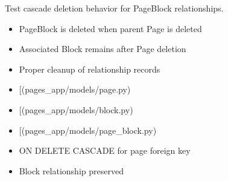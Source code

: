 \documentclass[letterpaper,10pt,english]{sphinxmanual}
\begin{document}
\begin{fulllineitems}
\begin{fulllineitems}
\end{fulllineitems}


\begin{fulllineitems}
\label{\detokenize{pages_app.tests:pages_app.tests.test_models.PageBlockModelTest.test_pageblock_cascade_deletion}}
\pysigstartsignatures
\pysiglinewithargsret
{}
{}
{}
\pysigstopsignatures
\sphinxAtStartPar
Test cascade deletion behavior for PageBlock relationships.
\begin{description}
\begin{itemize}
\item {} 
\sphinxAtStartPar
PageBlock is deleted when parent Page is deleted

\item {} 
\sphinxAtStartPar
Associated Block remains after Page deletion

\item {} 
\sphinxAtStartPar
Proper cleanup of relationship records

\end{itemize}

\begin{itemize}
\item {} 
\sphinxAtStartPar
{[}\sphinxtitleref{Page}{]}(pages\_app/models/page.py)

\item {} 
\sphinxAtStartPar
{[}\sphinxtitleref{Block}{]}(pages\_app/models/block.py)

\item {} 
\sphinxAtStartPar
{[}\sphinxtitleref{PageBlock}{]}(pages\_app/models/page\_block.py)

\end{itemize}

\begin{itemize}
\item {} 
\sphinxAtStartPar
ON DELETE CASCADE for page foreign key

\item {} 
\sphinxAtStartPar
Block relationship preserved

\end{itemize}


\end{description}
\end{fulllineitems}
\end{fulllineitems}
\end{document}

